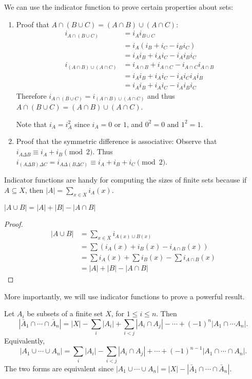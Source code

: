 \documentclass[a4paper]{article}
\begin{document}
\begin{eg}
  We can use the indicator function to prove certain properties about sets:
  \begin{enumerate}
    \item Proof that $A\cap(B\cup C) = (A\cap B)\cup (A\cap C)$:
      \begin{align*}
        i_{A\cap (B\cup C)} &= i_Ai_{B\cup C}\\
        &= i_A(i_B + i_C - i_Bi_C)\\
        &= i_Ai_B + i_Ai_C - i_Ai_Bi_C\\
        i_{(A\cap B)\cup (A\cap C)} &= i_{A\cap B} + i_{A\cap C} - i_{A\cap C}i_{A\cap B}\\
        &= i_Ai_B + i_Ai_C - i_Ai_Ci_Ai_B\\
        &= i_Ai_B + i_Ai_C - i_Ai_Bi_C
      \end{align*}
      Therefore $i_{A\cap (B\cup C)} = i_{(A\cap B)\cup (A\cap C)}$ and thus $A\cap(B\cup C) = (A\cap B)\cup (A\cap C)$.

      Note that $i_A = i_A^2$ since $i_A = 0 $ or $1$, and $0^2 = 0$ and $1^2 = 1$.
    \item Proof that the symmetric difference is associative: Observe that $i_{A\Delta B} \equiv i_A + i_B \pmod 2$. Thus $i_{(A\Delta B)\Delta C} = i_{A\Delta(B\Delta C)} \equiv i_A + i_B + i_C \pmod2$.
  \end{enumerate}
\end{eg}
Indicator functions are handy for computing the sizes of finite sets because if $A\subseteq X$, then $|A| = \sum\limits_{x\in X}i_A(x)$.

\begin{prop}
  $|A\cup B| = |A| + |B| - |A\cap B|$
\end{prop}

\begin{proof}
  \begin{align*}
    |A\cup B| &= \sum_{x\in X} i_{A(x)\cup B(x)}\\
    &= \sum (i_A(x) + i_B(x) - i_{A\cap B}(x))\\
    &= \sum i_A(x) + \sum i_B(x) - \sum i_{A\cap B}(x)\\
    &= |A| + |B| - |A\cap B|
  \end{align*}
\end{proof}

More importantly, we will use indicator functions to prove a powerful result.
\begin{thm}
  Let $A_i$ be subsets of a finite set $X$, for $1 \leq i\leq n$. Then
  \[
    |\bar A_1\cap \cdots \cap \bar A_n| = |X| - \sum_i |A_i| + \sum_{i < j}|A_i\cap A_j| - \cdots + (-1)^n|A_1\cap \cdots A_n|.
  \]
  Equivalently,
  \[
    |A_1\cup \cdots \cup A_n| = \sum_i|A_i| - \sum_{i < j}|A_i\cap A_j| + \cdots +(-1)^{n-1}|A_1\cap \cdots \cap A_n|.
  \]
  The two forms are equivalent since $|A_1\cup\cdots\cup A_n| = |X| - |\bar A_1\cap \cdots \cap \bar A_n|$.
\end{thm}
\end{document}
